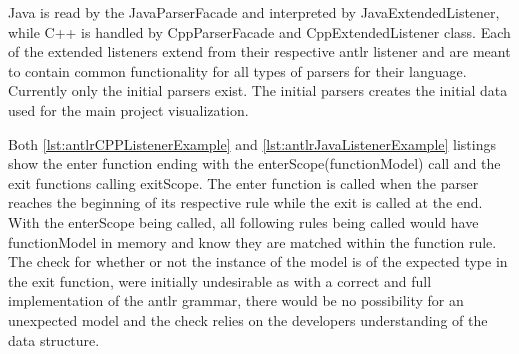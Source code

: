 Java is read by the JavaParserFacade and interpreted by JavaExtendedListener, while C++ is handled by CppParserFacade and CppExtendedListener class. Each of the extended listeners extend from their respective \gls{antlr} listener and are meant to contain common functionality for all types of parsers for their language. Currently only the initial parsers exist. The initial parsers creates the initial data used for the main project visualization. 

Both \ref{lst:antlrCPPListenerExample} and \ref{lst:antlrJavaListenerExample} listings show the enter function ending with the \newline enterScope(functionModel) call and the exit functions calling exitScope. The enter function is called when the parser reaches the beginning of its respective rule while the exit is called at the end. With the enterScope being called, all following rules being called would have functionModel in memory and know they are matched within the function rule. The check for whether or not the instance of the model is of the expected type in the exit function, were initially undesirable as with a correct and full implementation of the \gls{antlr} grammar, there would be no possibility for an unexpected model and the check relies on the developers understanding of the data structure.
